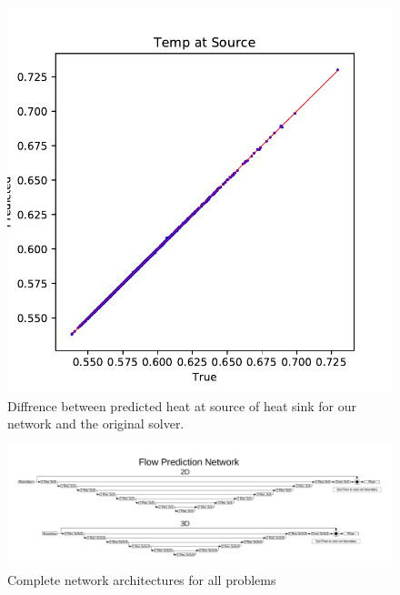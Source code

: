\documentclass{article} %
\begin{document}
\begin{figure}[h]
\begin{center}
\includegraphics[scale=0.40]{../test/figs/heat_accuracy.pdf}
\end{center}
\caption{Diffrence between predicted heat at source of heat sink for our network and the original solver.}
\end{figure}


\begin{figure}[h]
\begin{center}
\includegraphics[scale=0.45]{./appendix_flow_net.pdf}
\end{center}
\caption{Complete network architectures for all problems}
\label{network_architectures}
\end{figure}
\end{document}
